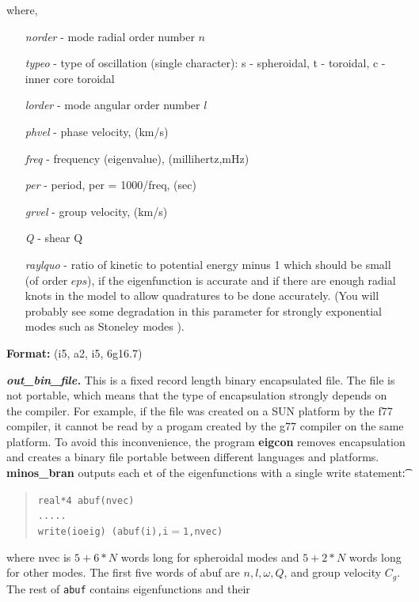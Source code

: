 \documentclass[11pt]{article}
\begin{document}
\begin{description}
\begin{description}
where,
\begin{itemize}
\item[{\it norder}] - mode radial order number $n$
\item[{\it typeo}] - type of oscillation (single character): s - spheroidal, t - toroidal, c - inner
core toroidal
\item[{\it lorder}] - mode angular order number $l$
\item[{\it phvel}] - phase velocity, (km/s)
\item[{\it freq}] - frequency (eigenvalue), (millihertz,mHz)
\item[{\it per}] - period, per = 1000/freq, (sec)
\item[{\it grvel}] - group velocity, (km/s)
\item[{\it Q}] - shear Q
\item[{\it raylquo}] - ratio of kinetic to potential energy
minus 1 which should be small (of order $eps$), if the eigenfunction is
accurate and if there are enough radial knots in the model to allow
quadratures to be done accurately. (You will probably see some degradation
in this parameter for strongly exponential modes such as Stoneley modes ). \\
\end{itemize}
{\bf Format:} (i5, a2, i5, 6g16.7)
\end{description}
\end{description}
\noindent \textbf{\large \emph{out\_bin\_file.}} This is a fixed record length
binary encapsulated file. The file is not portable, which means that the type
of encapsulation strongly depends on the compiler. For example, if the file
was created on a SUN platform by the f77 compiler, it cannot be read by a progam
created by the g77 compiler on the same platform. To avoid this inconvenience,
the program {\bf eigcon} removes encapsulation and creates a binary file
portable between different languages and platforms. \\
{\bf minos\_bran} outputs each  et of the eigenfunctions with a single write 
statement\t:
\begin{quote}
\texttt{real*4 abuf(nvec)} \\
\texttt{.....} \\
\texttt{write(ioeig) (abuf(i),i$=$1,nvec)} 
\end{quote}
where nvec is $5+6*N$ words long for spheroidal modes and $5+2*N$ words long 
for other modes. The first five words of abuf are $n,l,\omega, Q$, and
group velocity $C_g$. The rest of \texttt{abuf} contains eigenfunctions and their
\end{document}
